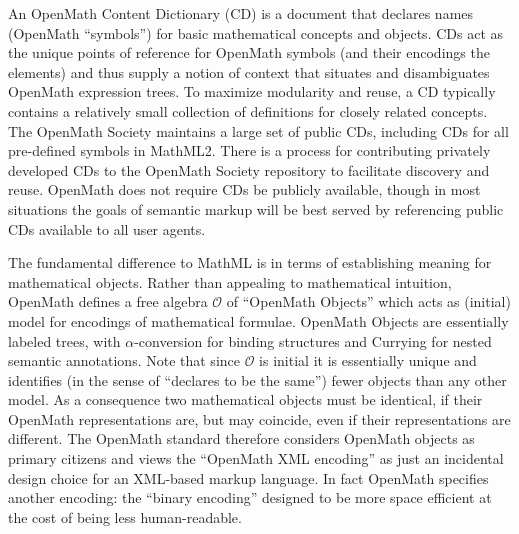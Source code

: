 \documentclass{llncs}
\begin{document}
An OpenMath Content Dictionary (CD) is a document that declares names (OpenMath
``symbols'') for basic mathematical concepts and objects. CDs act as the unique points of
reference for OpenMath symbols (and their encodings the {} elements) and
thus supply a notion of context that situates and disambiguates OpenMath expression
trees. To maximize modularity and reuse, a CD typically contains a relatively small
collection of definitions for closely related concepts. The OpenMath Society maintains a
large set of public CDs, including CDs for all pre-defined symbols in MathML2. There is a
process for contributing privately developed CDs to the OpenMath Society repository to
facilitate discovery and reuse. OpenMath does not require CDs be publicly available,
though in most situations the goals of semantic markup will be best served by referencing
public CDs available to all user agents.
 
The fundamental difference to MathML is in terms of establishing meaning for mathematical
objects. Rather than appealing to mathematical intuition, OpenMath defines a free algebra
$\mathcal{O}$ of ``OpenMath Objects'' which acts as (initial) model for encodings of
mathematical formulae. OpenMath Objects are essentially labeled trees, with
$\alpha$-conversion for binding structures and Currying for nested semantic
annotations. Note that since $\mathcal{O}$ is initial it is essentially unique and
identifies (in the sense of ``declares to be the same'') fewer objects than any other
model. As a consequence two mathematical objects must be identical, if their OpenMath
representations are, but may coincide, even if their representations are different. The
OpenMath standard therefore considers OpenMath objects as primary citizens and views the
``OpenMath XML encoding'' as just an incidental design choice for an XML-based markup
language. In fact OpenMath specifies another encoding: the ``binary encoding'' designed to
be more space efficient at the cost of being less human-readable.
\end{document}
